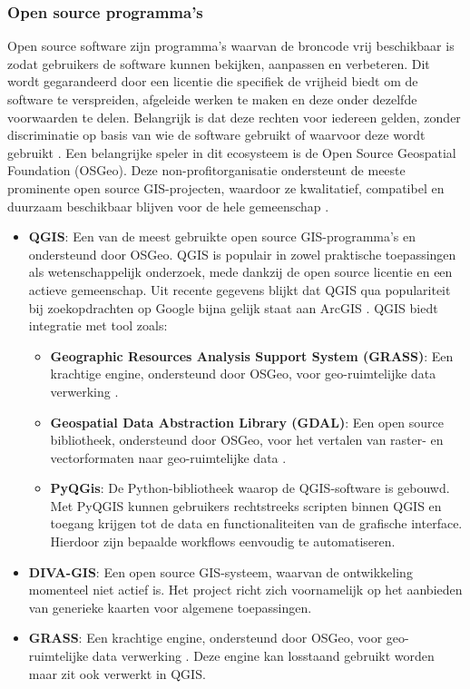 \subsubsection{Open source programma's}\label{sec:GIS-tools_open-source}
Open source software zijn programma's waarvan de broncode vrij beschikbaar is zodat gebruikers de software kunnen bekijken, aanpassen en verbeteren. Dit wordt gegarandeerd door een licentie die specifiek de vrijheid biedt om de software te verspreiden, afgeleide werken te maken en deze onder dezelfde voorwaarden te delen. Belangrijk is dat deze rechten voor iedereen gelden, zonder discriminatie op basis van wie de software gebruikt of waarvoor deze wordt gebruikt \autocite{Opensource2007}. Een belangrijke speler in dit ecosysteem is de Open Source Geospatial Foundation (OSGeo). Deze non-profitorganisatie ondersteunt de meeste prominente open source GIS-projecten, waardoor ze kwalitatief, compatibel en duurzaam beschikbaar blijven voor de hele gemeenschap \autocite{OSGeo2026}.

\begin{itemize}
    \item \textbf{QGIS}: Een van de meest gebruikte open source GIS-programma's en ondersteund door OSGeo. QGIS is populair in zowel praktische toepassingen als wetenschappelijk onderzoek, mede dankzij de open source licentie en een actieve gemeenschap. Uit recente gegevens blijkt dat QGIS qua populariteit bij zoekopdrachten op Google bijna gelijk staat aan ArcGIS \autocite{Trends2026}. QGIS biedt integratie met tool zoals: 
    \begin{itemize}
        \item \textbf{Geographic Resources Analysis Support System (GRASS)}: Een krachtige engine, ondersteund door OSGeo, voor geo-ruimtelijke data verwerking \autocite{GRASS_GIS_software}.
        \item \textbf{Geospatial Data Abstraction Library (GDAL)}: Een open source bibliotheek, ondersteund door OSGeo, voor het vertalen van raster- en vectorformaten naar geo-ruimtelijke data \autocite{Rouault2025}.
        \item \textbf{PyQGis}: De Python-bibliotheek waarop de QGIS-software is gebouwd. Met PyQGIS kunnen gebruikers rechtstreeks scripten binnen QGIS en toegang krijgen tot de data en functionaliteiten van de grafische interface. Hierdoor zijn bepaalde workflows eenvoudig te automatiseren.
    \end{itemize}   
    \item \textbf{DIVA-GIS}: Een open source GIS-systeem, waarvan de ontwikkeling momenteel niet actief is. Het project richt zich voornamelijk op het aanbieden van generieke kaarten voor algemene toepassingen.
    \item \textbf{GRASS}: Een krachtige engine, ondersteund door OSGeo, voor geo-ruimtelijke data verwerking \autocite{GRASS_GIS_software}. Deze engine kan losstaand gebruikt worden maar zit ook verwerkt in QGIS.
\end{itemize}

